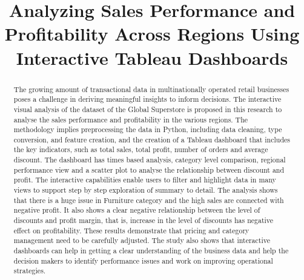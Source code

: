 \documentclass[conference]{IEEEtran}
\begin{document}
\title{Analyzing Sales Performance and Profitability Across Regions Using Interactive Tableau Dashboards
\\
}

\author{
\and 
{}
\and 
{}

}

\maketitle


\begin{abstract}
The growing amount of transactional data in multinationally operated retail businesses poses a challenge in deriving meaningful insights to inform decisions. The interactive visual analysis of the dataset of the Global Superstore is proposed in this research to analyse the sales performance and profitability in the various regions. The methodology implies preprocessing the data in Python, including data cleaning, type conversion, and feature creation, and the creation of a Tableau dashboard that includes the key indicators, such as total sales, total profit, number of orders and average discount. The dashboard has times based analysis, category level comparison, regional performance view and a scatter plot to analyse the relationship between discount and profit. The interactive capabilities enable users to filter and highlight data in many views to support step by step exploration of summary to detail. The analysis shows that there is a huge issue in Furniture category and the high sales are connected with negative profit. It also shows a clear negative relationship between the level of discounts and profit margin, that is, increase in the level of discounts has negative effect on profitability. These results demonstrate that pricing and category management need to be carefully adjusted. The study also shows that interactive dashboards can help in getting a clear understanding of the business data and help the decision makers to identify performance issues and work on improving operational strategies.
\end{abstract}
\end{document}
